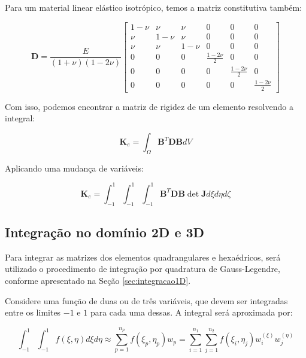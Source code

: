         Para um material linear elástico isotrópico, temos a matriz constitutiva também:

        \begin{equation}
            \mathbf{D} =
            \frac{E}{\left(1+\nu\right)\left(1-2\nu\right)}
            \begin{bmatrix}
                1-\nu & \nu & \nu & 0 & 0 & 0\\
                \nu & 1-\nu & \nu & 0 & 0 & 0\\
                \nu & \nu & 1-\nu & 0 & 0 & 0\\
                0 & 0 & 0 & \frac{1-2\nu}{2} & 0 & 0\\
                0 & 0 & 0 & 0 & \frac{1-2\nu}{2} & 0\\
                0 & 0 & 0 & 0 & 0 & \frac{1-2\nu}{2}
            \end{bmatrix}
        \end{equation}

        Com isso, podemos encontrar a matriz de rigidez de um elemento resolvendo a integral:

        \begin{equation}
            \mathbf{K}_e = \int_\Omega  \mathbf{B}^T \mathbf{D} \mathbf{B} dV
        \end{equation}

        Aplicando uma mudança de variáveis:

        \begin{equation}
            \mathbf{K}_e = \int_{-1}^{1} \int_{-1}^{1} \int_{-1}^{1}  \mathbf{B}^T \mathbf{D} \mathbf{B} \det \mathbf{J} d\xi d\eta d\zeta
        \end{equation}



    \subsection{Integração no domínio 2D e 3D}
    \label{sec:integracaonD}

        Para integrar as matrizes dos elementos quadrangulares e hexaédricos, será utilizado o procedimento de integração por quadratura de Gauss-Legendre, conforme apresentado na Seção \ref{sec:integracao1D}.

        Considere uma função de duas ou de três variáveis, que devem ser integradas entre os limites $-1$ e $1$ para cada uma dessas. A integral será aproximada por:

        \begin{equation*}
            \int_{-1}^{1} \int_{-1}^{1} f(\xi, \eta) d\xi d\eta \approx 
            \sum\limits_{p=1}^{n_p} f(\xi_p,\eta_p) w_p = 
            \sum\limits_{i=1}^{n_1} \sum\limits_{j=1}^{n_2} f(\xi_i,\eta_j) w_i^{(\xi)} w_j^{(\eta)}
        \end{equation*}

